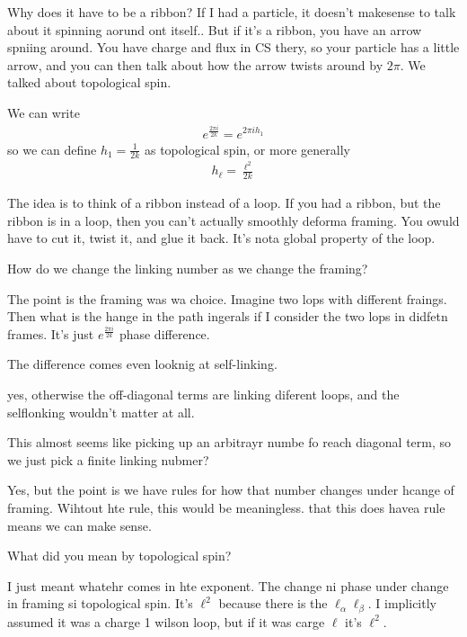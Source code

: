 Why does it have to be a ribbon?
If I had a particle,
it doesn't makesense to talk about it spinning aorund ont itself..
But if it's a ribbon,
you have an arrow spniing around.
You have charge and flux
in CS thery,
so your particle has a little arrow,
and you can then talk about how the arrow twists around by $2\pi$.
We talked about topological spin.

We can write
\begin{align}
    e^{\frac{2\pi i}{2k}}
    = e^{2\pi i h_1}
\end{align}
so we can define
$h_1 = \frac{1}{2k}$ as topological spin,
or more generally
\begin{align}
    h_\ell
    =
    \frac{\ell^2}{2k}
\end{align}

The idea is to think of a ribbon instead of a loop.
If you had a ribbon,
but the ribbon is in a loop,
then you can't actually smoothly deforma framing.
You owuld have to cut it,
twist it,
and glue it back.
It's nota global property of the loop.

\begin{question}
    How do we change the linking number as we change the framing?
\end{question}
The point is the framing was wa choice.
Imagine two lops with different fraings.
Then what is the hange in the path ingerals if I consider the two lops in
didfetn frames.
It's just $e^{\frac{2\pi i}{2k}}$ phase difference.

\begin{question}
    The difference comes even looknig at self-linking.
\end{question}
yes,
otherwise the off-diagonal terms are linking diferent loops,
and the selflonking wouldn't matter at all.

\begin{question}
    This almost seems like picking up an arbitrayr numbe fo reach diagonal term,
    so we just pick a finite linking nubmer?
\end{question}
Yes,
but the point is we have rules for how that number changes under hcange of
framing.
Wihtout hte rule,
this would be meaningless.
that this does havea rule means we can make sense.

\begin{question}
    What did you mean by topological spin?
\end{question}
I just meant whatehr comes in hte exponent.
The change ni phase under change in framing si topological spin.
It's $\ell^2$ because there is the $\ell_\alpha \ell_\beta$.
I implicitly assumed it was a charge 1 wilson loop,
but if it was carge $\ell$ it's $\ell^2$.

